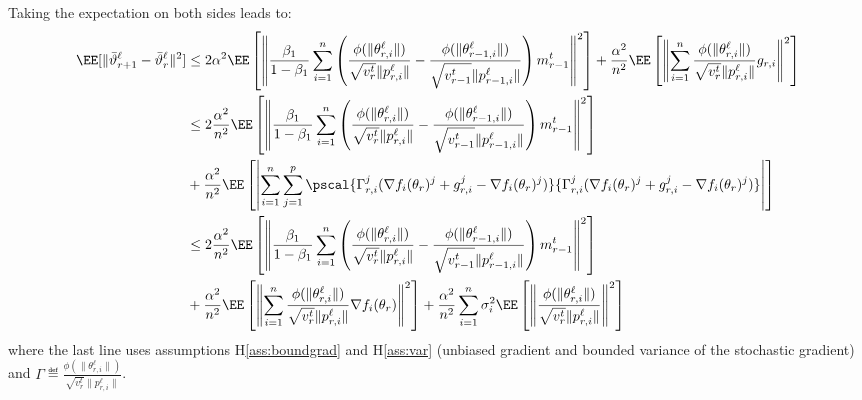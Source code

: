 \documentclass{article}
\begin{document}
Taking the expectation on both sides leads to:
\begin{align}\label{eq:maina2}
\begin{split}
\EE[  \| \bar{\vartheta}^\ell_{r+1} - \bar{\vartheta}^\ell_r \|^2] &  \leq 2\alpha^2 \EE \left[ \left\| \frac{ \beta_1}{1-\beta_1}  \sum_{i = 1}^n  \left( \frac{\phi(\|\theta_{r,i}^{\ell}\|)}{\sqrt{v^{t}_{r}} \|p_{r,i}^{\ell}\|} - \frac{\phi(\|\theta_{r-1,i}^{\ell}\|)}{\sqrt{v^{t}_{r-1}} \|p_{r-1,i}^{\ell}\|} \right) m^{t}_{r-1}\right\|^2 \right] +  \frac{\alpha^2}{n^2} \EE\left[ \left\| \sum_{i = 1}^n \frac{\phi(\|\theta_{r,i}^{\ell}\|)}{\sqrt{v^{t}_{r}} \|p_{r,i}^{\ell}\|} g_{r,i}\right\|^2 \right]\\
& \leq 2 \frac{\alpha^2}{n^2} \EE \left[ \left\| \frac{ \beta_1}{1-\beta_1}  \sum_{i = 1}^n  \left( \frac{\phi(\|\theta_{r,i}^{\ell}\|)}{\sqrt{v^{t}_{r}} \|p_{r,i}^{\ell}\|} - \frac{\phi(\|\theta_{r-1,i}^{\ell}\|)}{\sqrt{v^{t}_{r-1}} \|p_{r-1,i}^{\ell}\|} \right) m^{t}_{r-1}\right\|^2 \right] \\
& +  \frac{\alpha^2}{n^2} \EE\left[ \left| \sum_{i = 1}^n\sum_{j = 1}^p    \pscal{\Gamma_{r,i}^j (\nabla f_i(\theta_r)^j + g_{r,i}^j - \nabla f_i(\theta_r)^j) }{\Gamma_{r,i}^j (\nabla f_i(\theta_r)^j + g_{r,i}^j - \nabla f_i(\theta_r)^j)}\right| \right]\\
& \leq 2\frac{\alpha^2}{n^2} \EE \left[ \left\| \frac{ \beta_1}{1-\beta_1}  \sum_{i = 1}^n  \left( \frac{\phi(\|\theta_{r,i}^{\ell}\|)}{\sqrt{v^{t}_{r}} \|p_{r,i}^{\ell}\|} - \frac{\phi(\|\theta_{r-1,i}^{\ell}\|)}{\sqrt{v^{t}_{r-1}} \|p_{r-1,i}^{\ell}\|} \right) m^{t}_{r-1}\right\|^2 \right] \\
& +  \frac{\alpha^2}{n^2} \EE\left[ \left\| \sum_{i = 1}^n \frac{\phi(\|\theta_{r,i}^{\ell}\|)}{\sqrt{v^{t}_{r}} \|p_{r,i}^{\ell}\|}\nabla f_i(\theta_r) \right\|^2 \right] +  \frac{\alpha^2}{n^2} \sum_{i = 1}^n  \sigma_i^2 \EE\left[ \left\|\frac{\phi(\|\theta_{r,i}^{\ell}\|)}{\sqrt{v^{t}_{r}} \|p_{r,i}^{\ell}\|} \right\|^2 \right]\\
\end{split}
\end{align}
where the last line uses assumptions H\ref{ass:boundgrad} and H\ref{ass:var} (unbiased gradient and bounded variance of the stochastic gradient) and $\Gamma \eqdef  \frac{\phi(\|\theta_{r,i}^{\ell}\|)}{\sqrt{v^{t}_{r}} \|p_{r,i}^{\ell}\|} $.
\end{document}
